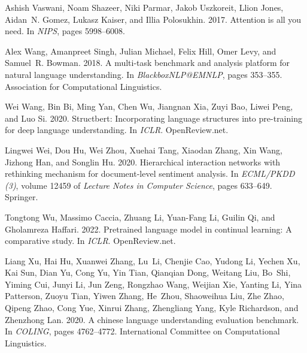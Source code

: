 \documentclass[11pt]{article}
\begin{document}
\begin{thebibliography}{59}
Ashish Vaswani, Noam Shazeer, Niki Parmar, Jakob Uszkoreit, Llion Jones,
  Aidan~N. Gomez, Lukasz Kaiser, and Illia Polosukhin. 2017.
\newblock Attention is all you need.
\newblock In \emph{{NIPS}}, pages 5998--6008.

Alex Wang, Amanpreet Singh, Julian Michael, Felix Hill, Omer Levy, and
  Samuel~R. Bowman. 2018.
 {A} multi-task benchmark and analysis platform for natural
  language understanding.
\newblock In \emph{BlackboxNLP@EMNLP}, pages 353--355. Association for
  Computational Linguistics.

Wei Wang, Bin Bi, Ming Yan, Chen Wu, Jiangnan Xia, Zuyi Bao, Liwei Peng, and
  Luo Si. 2020.
\newblock Structbert: Incorporating language structures into pre-training for
  deep language understanding.
\newblock In \emph{{ICLR}}. OpenReview.net.

Lingwei Wei, Dou Hu, Wei Zhou, Xuehai Tang, Xiaodan Zhang, Xin Wang, Jizhong
  Han, and Songlin Hu. 2020.
\newblock Hierarchical interaction networks with rethinking mechanism for
  document-level sentiment analysis.
\newblock In \emph{{ECML/PKDD} {(3)}}, volume 12459 of \emph{Lecture Notes in
  Computer Science}, pages 633--649. Springer.

Tongtong Wu, Massimo Caccia, Zhuang Li, Yuan{-}Fang Li, Guilin Qi, and
  Gholamreza Haffari. 2022.
\newblock Pretrained language model in continual learning: {A} comparative
  study.
\newblock In \emph{{ICLR}}. OpenReview.net.

Liang Xu, Hai Hu, Xuanwei Zhang, Lu~Li, Chenjie Cao, Yudong Li, Yechen Xu, Kai
  Sun, Dian Yu, Cong Yu, Yin Tian, Qianqian Dong, Weitang Liu, Bo~Shi, Yiming
  Cui, Junyi Li, Jun Zeng, Rongzhao Wang, Weijian Xie, Yanting Li, Yina
  Patterson, Zuoyu Tian, Yiwen Zhang, He~Zhou, Shaoweihua Liu, Zhe Zhao, Qipeng
  Zhao, Cong Yue, Xinrui Zhang, Zhengliang Yang, Kyle Richardson, and Zhenzhong
  Lan. 2020.
 {A} chinese language understanding evaluation benchmark.
\newblock In \emph{{COLING}}, pages 4762--4772. International Committee on
  Computational Linguistics.


\end{thebibliography}
\end{document}

